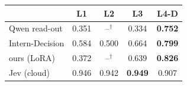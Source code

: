 \begin{tabular}{@{}lcccc@{}}
\toprule
 & L1 & L2 & L3 & L4-D \\
\midrule
Qwen read-out & 0.351 & --$^\dagger$ & 0.334 & \textbf{0.752} \\
Intern-Decision & 0.584 & 0.500 & 0.664 & \textbf{0.799} \\
ours (LoRA) & 0.372 & --$^\dagger$ & 0.639 & \textbf{0.826} \\
\midrule
Jev (cloud) & 0.946 & 0.942 & \textbf{0.949} & 0.907 \\
\bottomrule
\end{tabular}
